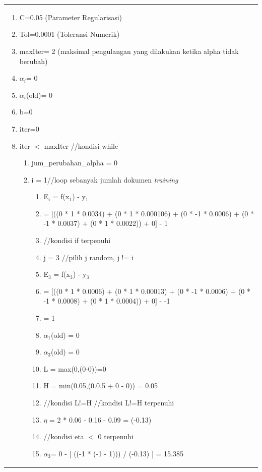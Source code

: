 \begin{table}[H]
	\centering
	\small
	\begin{adjustbox}{width=1\textwidth}
	\begin{tabular}{|p{13.55cm}|}
		\hline
		\begin{enumerate}[label={},leftmargin=*,noitemsep]
			\item C=0.05 (Parameter Regularisasi)
			\item Tol=0.0001 (Toleransi Numerik)
			\item maxIter= 2 (maksimal pengulangan yang dilakukan ketika alpha tidak berubah)
			\item $\alpha_{i}$= 0
			\item $\alpha_{i}$(old)= 0
			\item b=0
			\item iter=0
			\item iter $<$ maxIter //kondisi while
			\begin{enumerate}[label={},noitemsep]
				\item jum\_perubahan\_alpha = 0
				\item i = 1//loop sebanyak jumlah dokumen \textit{training}
				\begin{enumerate}[label={},noitemsep]
					\item E$_{i}$ = f(x$_{1}$) - y$_{1}$
					\item = $[$((0 * 1 * 0.0034) + (0 * 1 * 0.000106) + (0 * -1 * 0.0006) + (0 * -1 * 0.0037) 
					+ (0 * 1 * 0.0022)) + 0$]$ - 1
					\item //kondisi if terpenuhi
					\item j = 3 //pilih j random, j != i
					\item E$_{3}$ = f(x$_{3}$) - y$_{3 }$
					\item = $[$((0 * 1 * 0.0006) + (0 * 1 * 0.00013) + (0 * -1 * 0.0006) + (0 * -1 * 0.0008) + (0 * 1 * 0.0004)) + 0$]$ - -1
					\item = 1
					\item $\alpha_{1}$(old) = 0
					\item $\alpha_{3}$(old) = 0
					\item L = max(0,(0-0))=0
					\item H = min(0.05,(0.0.5 + 0 - 0)) = 0.05
					\item //kondisi L!=H //kondisi L!=H terpenuhi
					\item $\eta$ = 2 * 0.06 - 0.16 - 0.09 = (-0.13)
					\item //kondisi eta $<$ 0 terpenuhi
					\item $\alpha_{3}$= 0 - $[$ ((-1 * (-1 - 1))) / (-0.13) $]$ = 15.385

\end{enumerate}
\end{enumerate}
\end{enumerate}
\end{tabular}
\end{adjustbox}
\end{table}
